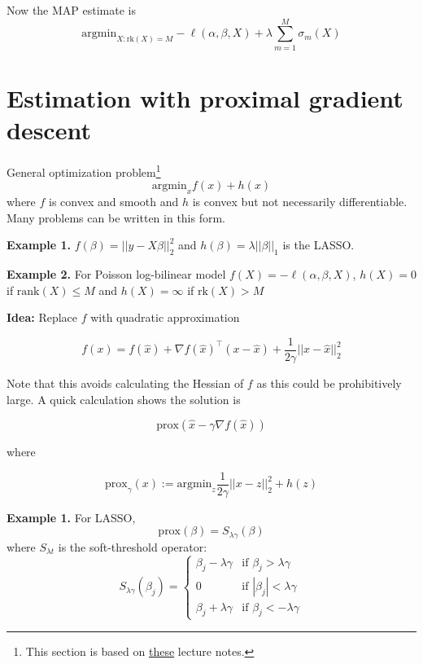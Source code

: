 \documentclass{article}
\begin{document}
Now the MAP estimate is 
\begin{equation}
\text{argmin}_{X: \text{rk}(X) = M} -\ell(\alpha, \beta, X) + \lambda \sum_{m=1}^M \sigma_m(X)
\end{equation}

\section{Estimation with proximal gradient descent} 

General optimization problem\footnote{This section is based on \href{https://www.stat.cmu.edu/~ryantibs/convexopt-F15/lectures/08-prox-grad.pdf}{these} lecture notes.}
\begin{equation}
\text{argmin}_{x} f(x) + h(x)
\end{equation}
where $f$ is convex and smooth and $h$ is convex but not necessarily differentiable. Many problems can be written in this form.

\medskip 

\textbf{Example 1.} $f(\beta) = || y - X\beta||_2^2$ and $h(\beta) = \lambda ||\beta||_1$ is the LASSO.

\medskip 

\textbf{Example 2.} For Poisson log-bilinear model $f(X) = -\ell(\alpha, \beta, X)$, $h(X) = 0$ if $\text{rank}(X) \leq M$ and $h(X) = \infty$ if $\text{rk}(X) > M$

\medskip 

\textbf{Idea:} Replace $f$ with quadratic approximation 

\begin{equation}
f(x) = f(\hat{x}) + \nabla f(\hat{x})^{\top} (x - \hat{x}) + \frac{1}{2\gamma} || x - \hat{x}||_2^2
\end{equation}

Note that this avoids calculating the Hessian of $f$ as this could be prohibitively large. A quick calculation shows the solution is 

\begin{equation}
\text{prox} \left( \hat{x} - \gamma \nabla f(\hat{x}) \right)
\end{equation}

where 

\begin{equation}
\text{prox}_{\gamma}(x) := \text{argmin}_{z} \frac{1}{2 \gamma} ||x - z||_2^2 + h(z)
\end{equation}

\medskip 

\textbf{Example 1.} For LASSO, 
\begin{equation}
\text{prox}(\beta) = S_{\lambda \gamma}(\beta)
\end{equation}
where $S_{\lambda t}$ is the soft-threshold operator:
\begin{equation}
S_{\lambda \gamma}(\beta_j) = \begin{cases}
\beta_j - \lambda \gamma &\text{if } \beta_j > \lambda \gamma \\
0 &\text{if } |\beta_j| < \lambda \gamma \\
\beta_j + \lambda \gamma &\text{if } \beta_j < -\lambda \gamma
\end{cases}
\end{equation}
\end{document}
